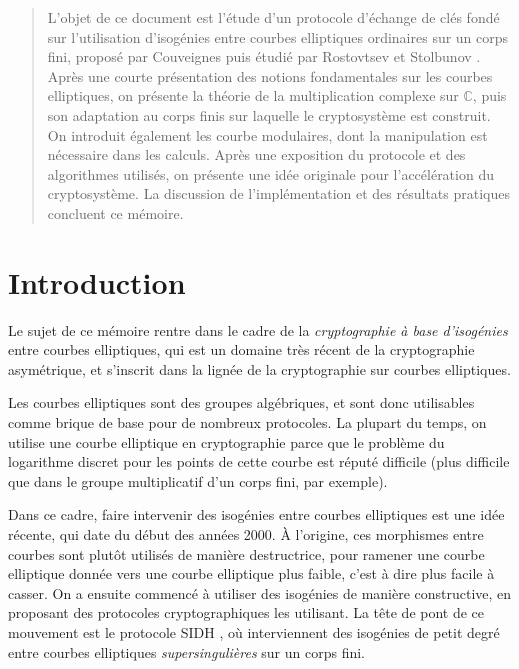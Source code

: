 \documentclass[11pt,a4paper]{article}
\newcommand{\C}{\mathbb{C}}
\theoremstyle{definition}
\begin{document}
\begin{abstract}

L'objet de ce document est l'étude d'un protocole d'échange de clés fondé sur l'utilisation d'isogénies entre courbes elliptiques ordinaires sur un corps fini, proposé par Couveignes \cite{Couv} puis étudié par Rostovtsev et Stolbunov \cite{RoSt}. Après une courte présentation des notions fondamentales sur les courbes elliptiques, on présente la théorie de la multiplication complexe sur $\C$, puis son adaptation au corps finis sur laquelle le cryptosystème est construit. On introduit également les courbe modulaires, dont la manipulation est nécessaire dans les calculs. Après une exposition du protocole et des algorithmes utilisés, on présente une idée originale pour l'accélération du cryptosystème. La discussion de l'implémentation et des résultats pratiques concluent ce mémoire.


\end{abstract}

\vfill

\tableofcontents

\vfill

\newpage

\section*{Introduction}


Le sujet de ce mémoire rentre dans le cadre de la \emph{cryptographie à base d'isogénies} entre courbes elliptiques, qui est un domaine très récent de la cryptographie asymétrique, et s'inscrit dans la lignée de la cryptographie sur courbes elliptiques.

Les courbes elliptiques sont des groupes algébriques, et sont donc utilisables comme brique de base pour de nombreux protocoles. La plupart du temps, on utilise une courbe elliptique en cryptographie parce que le problème du logarithme discret pour les points de cette courbe est réputé difficile (plus difficile que dans le groupe multiplicatif d'un corps fini, par exemple).

Dans ce cadre, faire intervenir des isogénies entre courbes elliptiques est une idée récente, qui date du début des années 2000. À l'origine, ces morphismes entre courbes sont plutôt utilisés de manière destructrice, pour ramener une courbe elliptique donnée vers une courbe elliptique plus faible, c'est à dire plus facile à casser. On a ensuite commencé à utiliser des isogénies de manière constructive, en proposant des protocoles cryptographiques les utilisant. La tête de pont de ce mouvement est le protocole SIDH \cite{SIDH}, où interviennent des isogénies de petit degré entre courbes elliptiques \emph{supersingulières} sur un corps fini.
\end{document}

